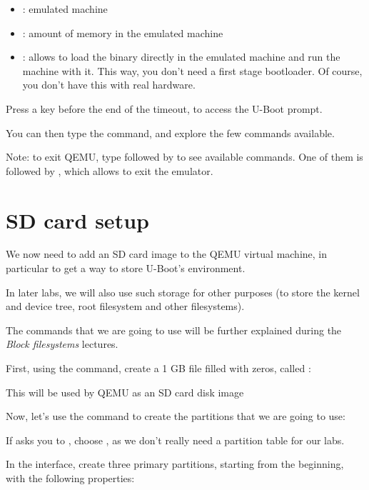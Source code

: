 \begin{itemize}
\item {}: emulated machine
\item {}: amount of memory in the emulated machine
\item {}: allows to load the binary directly in the emulated
      machine and run the machine with it. This way, you don't
      need a first stage bootloader. Of course, you don't
      have this with real hardware.
\end{itemize}

Press a key before the end of the timeout, to access the U-Boot prompt.

You can then type the  command, and explore the few commands
available.

Note: to exit QEMU, type \code{[Ctrl][a]} followed by \code{[h]}
to see available commands. One of them is \code{[Ctrl][a]} followed by
\code{[x]}, which allows to exit the emulator.

\section{SD card setup}

We now need to add an SD card image to the QEMU virtual machine,
in particular to get a way to store U-Boot's environment.

In later labs, we will also use such storage for other purposes
(to store the kernel and device tree, root filesystem and other
filesystems).

The commands that we are going to use will be further explained
during the {\em Block filesystems} lectures.

First, using the  command, create a 1 GB file
filled with zeros, called :


This will be used by QEMU as an SD card disk image

Now, let's use the  command to create the partitions that
we are going to use:


If  asks you to , choose
, as we don't really need a  partition table for
our labs.

In the  interface, create three primary partitions,
starting from the beginning, with the following properties:


